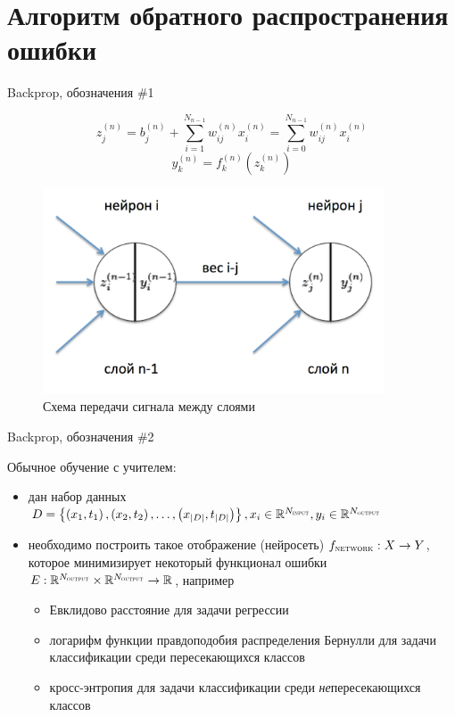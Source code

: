 \documentclass[10pt]{beamer}
\begin{document}
\section{Алгоритм обратного распространения ошибки}

\begin{frame}{Backprop, обозначения \#1}

\begin{equation}\label{eq:z}
	z^{(n)}_j = b^{(n)}_j + \sum^{N_{n-1}}_{i=1} w^{(n)}_{ij}x^{(n)}_i = \sum^{N_{n-1}}_{i=0} w^{(n)}_{ij}x^{(n)}_i
\end{equation}
\begin{equation}\label{eq:y}
	y^{(n)}_k = f^{(n)}_k\left(z^{(n)}_k\right)
\end{equation}

\begin{figure}[h!]
  \centering
  \includegraphics[width=0.9\textwidth]{images/backprop1.png}
  \caption{Схема передачи сигнала между слоями}
\end{figure}

\end{frame}


\begin{frame}{Backprop, обозначения \#2}

Обычное обучение с учителем:
\begin{itemize}
	\item дан набор данных $D = \left\{ \left(x_1, t_1\right), \left(x_2, t_2\right), \ldots, \left(x_{|D|}, t_{|D|}\right) \right\}, x_i \in \mathbb{R}^{N_{\textsc{input}}}, y_i \in \mathbb{R}^{N_{\textsc{output}}}$
	\item необходимо построить такое отображение (нейросеть) $f_{\textsc{network}}: X \rightarrow Y$, которое минимизирует некоторый функционал ошибки $E: \mathbb{R}^{N_{\textsc{output}}} \times \mathbb{R}^{N_{\textsc{output}}} \rightarrow \mathbb{R}$, например
	\begin{itemize}
		\item Евклидово расстояние для задачи регрессии
		\item логарифм функции правдоподобия распределения Бернулли для задачи классификации среди пересекающихся классов
		\item кросс-энтропия для задачи классификации среди \textit{не}пересекающихся классов
	\end{itemize}
\end{itemize}

\end{frame}
\end{document}

